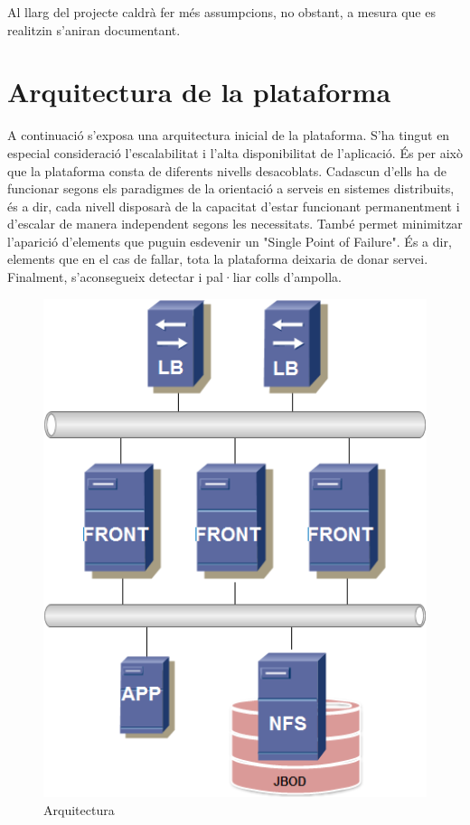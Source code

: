 \documentclass[a4paper, 11pt]{article}
\begin{document}
Al llarg del projecte caldrà fer més assumpcions, no obstant, a mesura que es realitzin s'aniran documentant.


\section{Arquitectura de la plataforma}

A continuació s'exposa una arquitectura inicial de la plataforma. S'ha tingut en especial consideració l'escalabilitat i l'alta disponibilitat de l'aplicació. És per això que la plataforma consta de diferents nivells desacoblats. Cadascun d'ells ha de funcionar segons els paradigmes de la orientació a serveis en sistemes distribuits, és a dir, cada nivell disposarà de la capacitat d'estar funcionant permanentment i d'escalar de manera independent segons les necessitats. 
També permet minimitzar l'aparició d'elements que puguin esdevenir un "Single Point of Failure". És a dir, elements que en el cas de fallar, tota la plataforma deixaria de donar servei. Finalment, s’aconsegueix detectar i pal·liar colls d'ampolla.

\begin{figure}[H]
    \centering
    \includegraphics[width=1.0\textwidth]{IM}
    \caption{Arquitectura \label{fig:centralized}}    
\end{figure}
\end{document}
